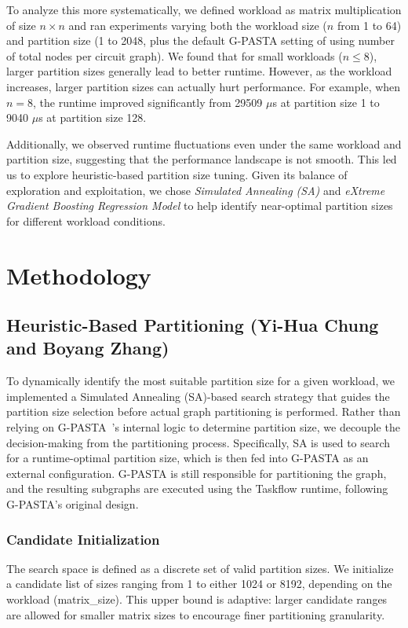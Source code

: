 \documentclass[9pt,conference]{IEEEtran}
\begin{document}
To analyze this more systematically, we defined workload as matrix multiplication of size $n \times n$ and ran experiments varying both the workload size ($n$ from 1 to 64) and partition size (1 to 2048, plus the default G-PASTA setting of using number of total nodes per circuit graph). 
We found that for small workloads ($n \leq 8$), larger partition sizes generally lead to better runtime. 
However, as the workload increases, larger partition sizes can actually hurt performance. 
For example, when $n=8$, the runtime improved significantly from 29509 $\mu$s at partition size 1 to 9040 $\mu$s at partition size 128.

Additionally, we observed runtime fluctuations even under the same workload and partition size, suggesting that the performance landscape is not smooth. 
This led us to explore heuristic-based partition size tuning. Given its balance of exploration and exploitation, we chose \textit{Simulated Annealing (SA)} and \textit{eXtreme Gradient Boosting Regression Model} to help identify near-optimal partition sizes for different workload conditions.

\section{Methodology}
\subsection{Heuristic-Based Partitioning (Yi-Hua Chung and Boyang Zhang)}


To dynamically identify the most suitable partition size for a given workload, we implemented a Simulated Annealing (SA)-based search strategy that guides the partition size selection before actual graph partitioning is performed. Rather than relying on G-PASTA~\cite{zhang2024g}’s internal logic to determine partition size, we decouple the decision-making from the partitioning process. Specifically, SA is used to search for a runtime-optimal partition size, which is then fed into G-PASTA as an external configuration. G-PASTA is still responsible for partitioning the graph, and the resulting subgraphs are executed using the Taskflow runtime, following G-PASTA’s original design.
\subsubsection{Candidate Initialization}
The search space is defined as a discrete set of valid partition sizes. We initialize a candidate list of sizes ranging from 1 to either 1024 or 8192, depending on the workload (matrix\_size). 
This upper bound is adaptive: larger candidate ranges are allowed for smaller matrix sizes to encourage finer partitioning granularity.
\end{document}
